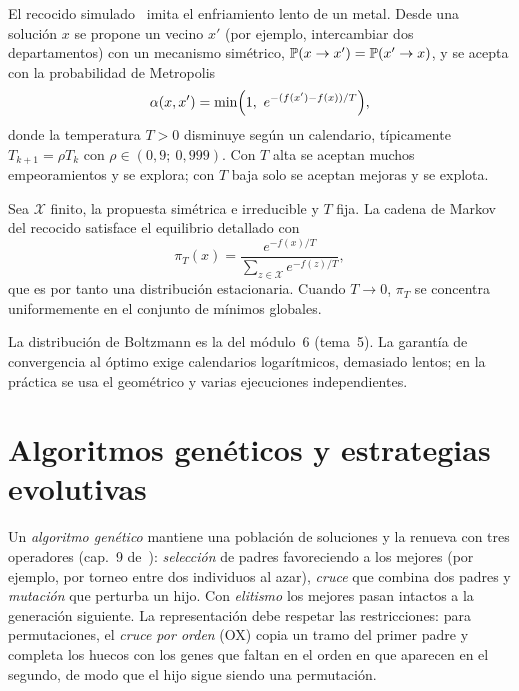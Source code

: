 El recocido simulado~\cite{kirkpatrick} imita el enfriamiento lento de un metal. Desde una solución $x$ se propone un vecino $x'$ (por ejemplo, intercambiar dos departamentos) con un mecanismo simétrico, $\mathbb{P}(x\to x')=\mathbb{P}(x'\to x)$, y se acepta con la probabilidad de Metropolis
\[
\alpha(x,x')=\min\Bigl(1,\ e^{-(f(x')-f(x))/T}\Bigr),
\]
donde la temperatura $T>0$ disminuye según un calendario, típicamente $T_{k+1}=\rho T_k$ con $\rho\in(0{,}9;\ 0{,}999)$. Con $T$ alta se aceptan muchos empeoramientos y se explora; con $T$ baja solo se aceptan mejoras y se explota.

\begin{proposicion}\label{prop:boltzmann}
Sea $\mathcal{X}$ finito, la propuesta simétrica e irreducible y $T$ fija. La cadena de Markov del recocido satisface el equilibrio detallado con
\[
\pi_T(x)=\frac{e^{-f(x)/T}}{\sum_{z\in\mathcal{X}}e^{-f(z)/T}},
\]
que es por tanto una distribución estacionaria. Cuando $T\to 0$, $\pi_T$ se concentra uniformemente en el conjunto de mínimos globales.
\end{proposicion}

La distribución de Boltzmann es la del módulo~6 (tema~5). La garantía de convergencia al óptimo exige calendarios logarítmicos, demasiado lentos; en la práctica se usa el geométrico y varias ejecuciones independientes.

\section{Algoritmos genéticos y estrategias evolutivas}

Un \emph{algoritmo genético} mantiene una población de soluciones y la renueva con tres operadores (cap.~9 de~\cite{kw}): \emph{selección} de padres favoreciendo a los mejores (por ejemplo, por torneo entre dos individuos al azar), \emph{cruce} que combina dos padres y \emph{mutación} que perturba un hijo. Con \emph{elitismo} los mejores pasan intactos a la generación siguiente. La representación debe respetar las restricciones: para permutaciones, el \emph{cruce por orden} (OX) copia un tramo del primer padre y completa los huecos con los genes que faltan en el orden en que aparecen en el segundo, de modo que el hijo sigue siendo una permutación.

